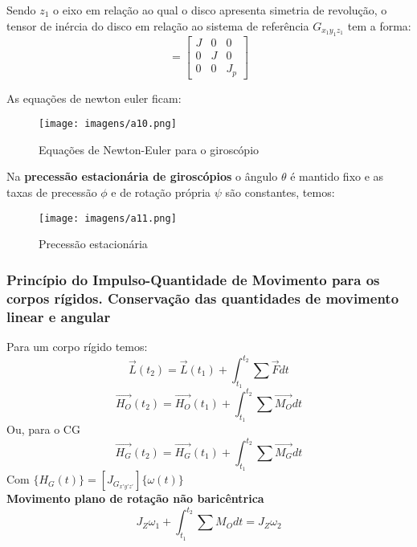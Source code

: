 \documentclass[a4paper, 12pt]{article}
\begin{document}
		Sendo $z_1$ o eixo em relação ao qual o disco apresenta simetria de revolução, o tensor de inércia do disco em relação ao sistema de referência $G_{x_1y_1z_1}$ tem a forma:
		\begin{equation}
			[J_{G_{x_1y_1z_1}}] = \begin{bmatrix}
			J & 0 & 0\\
			0 & J & 0\\
			0 & 0 & J_p
			\end{bmatrix}
		\end{equation}

		As equações de newton euler ficam:
		\begin{figure}[h]
			\center
			\texttt{[image: imagens/a10.png]} 
			\caption{Equações de Newton-Euler para o giroscópio}
		\end{figure}

		Na \textbf{precessão estacionária de giroscópios} o ângulo $\theta$ é mantido fixo e as taxas de precessão $\phi$ e de rotação própria $\psi$ são constantes, temos:
		 \begin{figure}[h]
			\center
			\texttt{[image: imagens/a11.png]} 
			\caption{Precessão estacionária}
		\end{figure}

		\subsubsection{Princípio do Impulso-Quantidade de Movimento para os corpos rígidos. Conservação das quantidades de movimento linear e angular}
		Para um corpo rígido temos:
		\begin{equation}
			\vec{L}(t_2) = \vec{L}(t_1) + \int^{t_2}_{t_1} \sum \vec{F}dt
		\end{equation}
		\begin{equation}
			\vec{H_O}(t_2) = \vec{H_O}(t_1) + \int^{t_2}_{t_1} \sum \vec{M_O}dt
		\end{equation}
		Ou, para o CG
		\begin{equation}
			\vec{H_G}(t_2) = \vec{H_G}(t_1) + \int^{t_2}_{t_1} \sum \vec{M_G}dt
		\end{equation}
		Com $\{H_G(t)\} = [J_{G_{x'y'z'}}]\{\omega (t)\}$\\
		
		\textbf{Movimento plano de rotação não baricêntrica}\\
		\begin{equation}
			J_Z\omega_1 + \int^{t_2}_{t_1} \sum M_Odt = J_Z \omega_2
		\end{equation}
\end{document}
